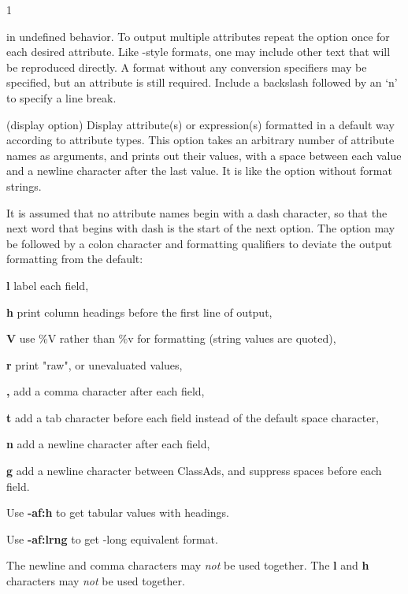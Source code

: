 \begin{ManPage}{\label{man-condor-who}}{1}
\begin{Options}
{      in undefined behavior.  To output multiple attributes
      repeat the  option once for each desired
      attribute.
      Like -style formats, one may include other
      text that will be reproduced directly.
      A format without any conversion specifiers may be specified,
      but an attribute is still required.
      Include a backslash followed by an `n' to specify a line break. }
   {
    (display option) Display attribute(s) or expression(s)
    formatted in a default way according to attribute types.  
    This option takes an arbitrary number of attribute names as arguments,
    and prints out their values, 
    with a space between each value and a newline character after 
    the last value.  
    It is like the  option without format strings.

    It is assumed that no attribute names begin with a dash character,
    so that the next word that begins with dash is the 
    start of the next option.
    The  option may be followed by a colon character
    and formatting qualifiers to deviate the output formatting from
    the default:

    \textbf{l} label each field,

    \textbf{h} print column headings before the first line of output,

    \textbf{V} use \%V rather than \%v for formatting (string values
    are quoted),

    \textbf{r} print "raw", or unevaluated values,

    \textbf{,} add a comma character after each field,

    \textbf{t} add a tab character before each field instead of 
    the default space character,

    \textbf{n} add a newline character after each field,

    \textbf{g} add a newline character between ClassAds, and
    suppress spaces before each field.

    Use \textbf{-af:h} to get tabular values with headings.

    Use \textbf{-af:lrng} to get -long equivalent format.

    The newline and comma characters may \emph{not} be used together.
    The \textbf{l} and \textbf{h} characters may \emph{not} be used
    together.
    }
\end{Options}


\end{ManPage}
